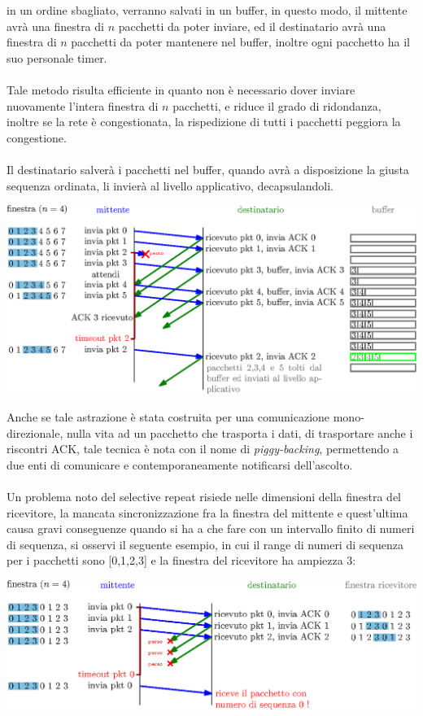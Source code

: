 \documentclass[12pt, letterpaper]{article}
\newcommand{\acc}{\\\hphantom{}\\}
\begin{document}
in un ordine sbagliato, verranno salvati in un buffer, in questo modo, il mittente avrà una finestra di $n$ pacchetti
da poter inviare, ed il destinatario avrà una finestra di $n$ pacchetti da poter mantenere nel buffer, inoltre ogni
pacchetto ha il suo personale timer.\acc
Tale metodo risulta efficiente in quanto non è necessario dover inviare nuovamente l'intera finestra di $n$ pacchetti,
e riduce il grado di ridondanza, inoltre se la rete è congestionata, la rispedizione di tutti i pacchetti
peggiora la congestione. \acc
Il destinatario salverà i pacchetti nel buffer, quando avrà a disposizione la giusta sequenza ordinata, li invierà
al livello applicativo, decapsulandoli.\begin{center}
    \includegraphics[width=1\textwidth ]{images/selectiveRepeat.eps}
\end{center}
Anche se tale astrazione è stata costruita per una comunicazione mono-direzionale, nulla vita ad un pacchetto che
trasporta i dati, di trasportare anche i riscontri ACK, tale tecnica è nota con il nome di \textit{piggy-backing},
permettendo a due enti di comunicare e contemporaneamente notificarsi dell'ascolto.\acc
Un problema noto del selective repeat risiede nelle dimensioni della finestra del ricevitore, la mancata sincronizzazione
fra la finestra del mittente e quest'ultima causa gravi conseguenze quando si ha a che fare con un intervallo finito
di numeri di sequenza, si osservi il seguente esempio, in cui il range di numeri di sequenza per i
pacchetti sono [0,1,2,3] e la finestra del ricevitore ha ampiezza 3:\begin{center}
    \includegraphics[width=\textwidth ]{images/ErroreSelectiveRepeat.eps}
\end{center}
\end{document}

